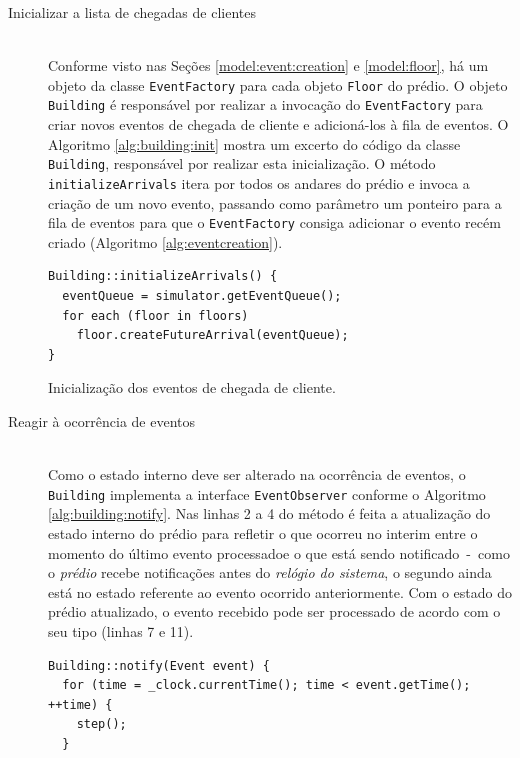 \begin{description}
  \item[Inicializar a lista de chegadas de clientes] \hfill \\
    Conforme visto nas Seções \ref{model:event:creation} e \ref{model:floor}, há
    um objeto da classe \texttt{EventFactory} para cada objeto \texttt{Floor} do
    prédio. O objeto \texttt{Building} é responsável por realizar a invocação do
    \texttt{EventFactory} para criar novos eventos de chegada de cliente e
    adicioná-los à fila de eventos. O Algoritmo \ref{alg:building:init} mostra
    um excerto do código da classe \texttt{Building}, responsável por realizar
    esta inicialização. O método \texttt{initializeArrivals} itera por todos os
    andares do prédio e invoca a criação de um novo evento, passando como
    parâmetro um ponteiro para a fila de eventos para que o
    \texttt{EventFactory} consiga adicionar o evento recém criado (Algoritmo
    \ref{alg:eventcreation}).

    \begin{algorithm}[htb!]
      \centering
        \begin{verbatim}
Building::initializeArrivals() {
  eventQueue = simulator.getEventQueue();
  for each (floor in floors)
    floor.createFutureArrival(eventQueue);
}
        \end{verbatim}
      \caption{Inicialização dos eventos de chegada de cliente.}
      \label{alg:building:init}
    \end{algorithm}

  \item[Reagir à ocorrência de eventos] \hfill \\
    Como o estado interno deve ser alterado na ocorrência de eventos, o
    \texttt{Building} implementa a interface \texttt{EventObserver} conforme o
    Algoritmo \ref{alg:building:notify}. Nas linhas 2 a 4 do método é feita a
    atualização do estado interno do prédio para refletir o que ocorreu no
    interim entre o momento do último evento processadoe o que está sendo
    notificado~-~como o \textit{prédio} recebe notificações antes do
    \textit{relógio do sistema}, o segundo ainda está no estado referente ao
    evento ocorrido anteriormente. Com o estado do prédio atualizado, o evento
    recebido pode ser processado de acordo com o seu tipo (linhas 7 e 11).

    \begin{algorithm}[htb!]
      \centering
        \begin{verbatim}
Building::notify(Event event) {
  for (time = _clock.currentTime(); time < event.getTime(); ++time) {
    step();
  }


\end{verbatim}
\end{algorithm}
\end{description}
